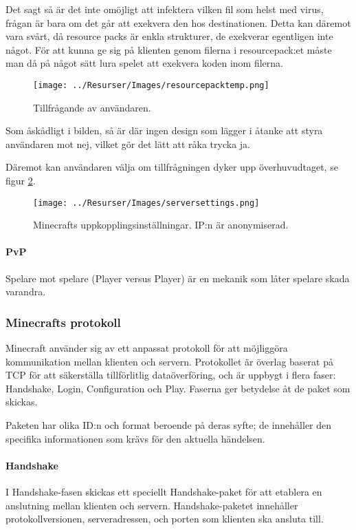 \documentclass[journal,comsoc]{IEEEtran}
\begin{document}
Det sagt så är det inte omöjligt att infektera vilken fil som helst med virus, frågan är bara om det går att exekvera den hos destinationen. Detta kan däremot vara svårt, då resource packs är enkla strukturer, de exekverar egentligen inte något. För att kunna ge sig på klienten genom filerna i resourcepack:et måste man då på något sätt lura spelet att exekvera koden inom filerna.

\begin{figure} [H]
  \centering
  \texttt{[image: ../Resurser/Images/resourcepacktemp.png]}
  \caption{Tillfrågande av användaren.}
  \label{fig:resourcepackprompt}
\end{figure}

Som åskådligt i bilden, så är där ingen design som lägger i åtanke att styra användaren mot nej, vilket gör det lätt att råka trycka ja.

Däremot kan användaren välja om tillfrågningen dyker upp överhuvudtaget, se figur \ref{fig:resourcepackenable}.
\begin{figure} [H]
  \centering
  \texttt{[image: ../Resurser/Images/serversettings.png]}
  \caption{Minecrafts uppkopplingsinställningar. IP:n är anonymiserad.}
  \label{fig:resourcepackenable}
\end{figure}

\paragraph{PvP}
Spelare mot spelare (Player versus Player) är en mekanik som låter spelare skada varandra.

\subsubsection{Minecrafts protokoll}
Minecraft använder sig av ett anpassat protokoll för att möjliggöra kommunikation mellan klienten och servern. Protokollet är överlag baserat på TCP för att säkerställa tillförlitlig dataöverföring, och är uppbygt i flera faser: Handshake, Login, Configuration och Play. Faserna ger betydelse åt de paket som skickas.

Paketen har olika ID:n och format beroende på deras syfte; de innehåller den specifika informationen som krävs för den aktuella händelsen.

\paragraph{Handshake}
I Handshake-fasen skickas ett speciellt Handshake-paket för att etablera en anslutning mellan klienten och servern. Handshake-paketet innehåller protokollversionen, serveradressen, och porten som klienten ska ansluta till.
\end{document}
